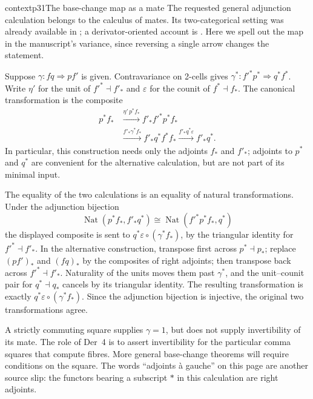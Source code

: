 \begin{dcomment}{context}{p31}{The base-change map as a mate}
The requested general adjunction calculation belongs to the calculus of
mates. Its two-categorical setting was already available in
\citet{KellyStreet1974}; a derivator-oriented account is
\citet[Appendix~A]{GrothPontoShulman2014}. Here we spell out the map in
the manuscript's variance, since reversing a single arrow changes the
statement.

Suppose $\gamma:fq\Rightarrow pf'$ is given. Contravariance on
2-cells gives
$\gamma^*:f'^*p^*\Rightarrow q^*f^*$. Write $\eta'$ for the unit of
$f'^*\dashv f'_*$ and $\varepsilon$ for the counit of
$f^*\dashv f_*$. The canonical transformation is the composite
\[
\begin{aligned}
 p^*f_*&\xrightarrow{\eta'\,p^*f_*}
       f'_*f'^*p^*f_*\\
 &\xrightarrow{f'_*\gamma^*f_*}f'_*q^*f^*f_*
   \xrightarrow{f'_*q^*\varepsilon}f'_*q^* .
\end{aligned}
\]
In particular, this construction needs only the adjoints $f_*$ and
$f'_*$; adjoints to $p^*$ and $q^*$ are convenient for the alternative
calculation, but are not part of its minimal input.

The equality of the two calculations is an equality of natural
transformations. Under the adjunction bijection
\[
 \operatorname{Nat}(p^*f_*,f'_*q^*)
 \cong\operatorname{Nat}(f'^*p^*f_*,q^*)
\]
the displayed composite is sent to
$q^*\varepsilon\circ(\gamma^*f_*)$, by the triangular identity for
$f'^*\dashv f'_*$. In the alternative construction, transpose first
across $p^*\dashv p_*$; replace $(pf')_*$ and $(fq)_*$ by the
composites of right adjoints; then transpose back across
$f'^*\dashv f'_*$. Naturality of the units moves them past
$\gamma^*$, and the unit--counit pair for $q^*\dashv q_*$ cancels by
its triangular identity. The resulting transformation is exactly
$q^*\varepsilon\circ(\gamma^*f_*)$. Since the adjunction bijection is
injective, the original two transformations agree.

A strictly commuting square supplies $\gamma=1$, but does not supply
invertibility of its mate. The role of Der~4 is to assert invertibility
for the particular comma squares that compute fibres. More general
base-change theorems will require conditions on the square. The words
``adjoints \`a gauche'' on this page are another source slip: the
functors bearing a subscript $*$ in this calculation are right adjoints.
\end{dcomment}


